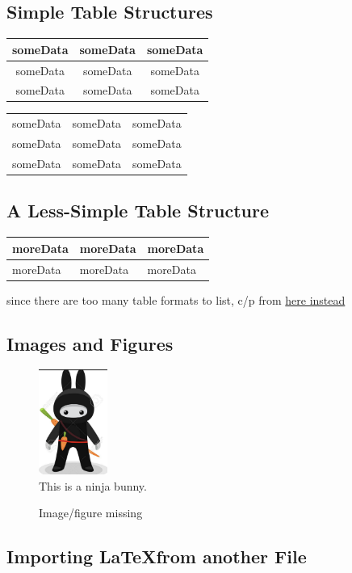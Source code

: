 \documentclass[12pt,twoside,a4paper]{article}
\begin{document}
\subsection*{Simple Table Structures}

\begin{tabular}{ c |c| c }
 someData & someData & someData \\
 \hline
 someData & someData & someData \\
 someData & someData & someData
\end{tabular}

\begin{tabular}{ |c|c|c| }
\hline
 someData & someData & someData \\
 someData & someData & someData \\
 someData & someData & someData \\
\hline
\end{tabular}

\subsection*{A Less-Simple Table Structure}
\begin{tabularx}{0.8\textwidth} {
  | >{\raggedright\arraybackslash}X
  | >{\centering\arraybackslash}X
  | >{\raggedleft\arraybackslash}X | }
 \hline
 moreData & moreData & moreData \\
 \hline
 moreData & moreData & moreData \\
\hline
\end{tabularx}
\newline since there are too many table formats to list, c/p from \href{https://www.overleaf.com/learn/latex/tables}{here instead}

\newpage
\subsection*{Images and Figures}

\begin{figure}[htbp]
  \centering
  \includegraphics[width=0.2\textwidth]{ninjaBunny.jpg}
  \caption{This is a ninja bunny.}
\end{figure}

\begin{figure}[htbp]
  \centering
  \caption{Image/figure missing}
\end{figure}

\newpage
\subsection*{Importing \LaTeX from another File}

\end{document}
